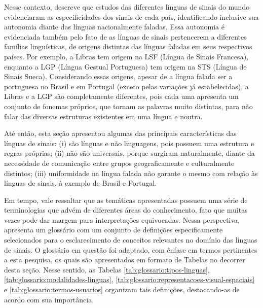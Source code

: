 Nesse contexto,  descreve que estudos das diferentes línguas de sinais do mundo evidenciaram as especificidades dos sinais de cada país, identificando inclusive sua autonomia diante das línguas nacionalmente faladas. Essa autonomia é evidenciada também pelo fato de as línguas de sinais pertencerem a diferentes famílias linguísticas, de origens distintas das línguas faladas em seus respectivos países. Por exemplo, a Libras tem origem na LSF (Língua de Sinais Francesa), enquanto a LGP (Língua Gestual Portuguesa) tem origem na STS (Língua de Sinais Sueca). Considerando essas origens, apesar de a língua falada ser a portuguesa no Brasil e em Portugal (exceto pelas variações já estabelecidas), a Libras e a LGP são completamente diferentes, pois cada uma apresenta um conjunto de fonemas próprios, que tornam as palavras muito distintas, para não falar das diversas estruturas existentes em uma língua e noutra.

Até então, esta seção apresentou algumas das principais características das línguas de sinais: (i) são línguas e não linguagens, pois possuem uma estrutura e regras próprias; (ii) não são universais, porque surgiram naturalmente, diante da necessidade de comunicação entre grupos geograficamente e culturalmente distintos; (iii) uniformidade na língua falada não garante o mesmo com relação às línguas de sinais, à exemplo de Brasil e Portugal.

Em tempo, vale ressaltar que as temáticas apresentadas possuem uma série de terminologias que advém de diferentes áreas do conhecimento, fato que muitas vezes pode dar margem para interpretações equivocadas. Nessa perspectiva,  apresenta um glossário com um conjunto de definições especificamente selecionados para o esclarecimento de conceitos relevantes no domínio das línguas de sinais. O glossário em questão foi adaptado, com ênfase em termos pertinentes a esta pesquisa, os quais são apresentados em formato de Tabelas no decorrer desta seção. Nesse sentido, as Tabelas \ref{tab:glossario:tipos-linguas}, \ref{tab:glossario:modalidades-linguas}, \ref{tab:glossario:representacoes-visual-espaciais} e \ref{tab:glossario:termos-usuarios} organizam tais definições, destacando-as de acordo com sua importância.


